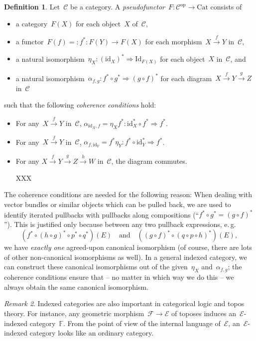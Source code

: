 \documentclass[a4paper,english,12pt]{scrartcl}
\theoremstyle{definition}
\newtheorem{defn}{Definition}[section]
\theoremstyle{plain}
\theoremstyle{remark}
\newtheorem{rem}[defn]{Remark}
\newcommand{\FF}{\mathbb{F}}
\newcommand{\C}{\mathcal{C}}
\newcommand{\E}{\mathcal{E}}
\newcommand{\F}{\mathcal{F}}
\newcommand{\id}{\mathrm{id}}
\newcommand{\op}{\mathrm{op}}
\newcommand{\xra}[1]{\xrightarrow{#1}}
\newcommand{\Cat}{\mathrm{Cat}}
\newcommand{\Id}{\mathrm{Id}}
\begin{document}
\begin{defn}Let~$\C$ be a category. A \emph{pseudofunctor}~$F : \C^\op \to
\Cat$ consists of
\begin{itemize}
\item a category~$F(X)$ for each object~$X$ of~$\C$,
\item a functor~$F(f) =: f^* : F(Y) \to F(X)$ for each morphism~$X \xra{f} Y$ in~$\C$,
\item a natural isomorphism~$\eta_X : (\id_X)^* \Rightarrow \Id_{F(X)}$ for each
object~$X$ in~$\C$, and
\item a natural isomorphism~$\alpha_{f,g} : f^* \circ g^* \Rightarrow (g \circ
f)^*$ for each diagram~$X \xra{f} Y \xra{g} Z$ in~$\C$
\end{itemize}
such that the following \emph{coherence conditions} hold:
\begin{itemize}
\item For any~$X \xra{f} Y$ in~$\C$, $\alpha_{\id_X,f} = \eta_X f^* : \id_X^* \circ f^*
\Rightarrow f^*$.
\item For any~$X \xra{f} Y$ in~$\C$, $\alpha_{f,\id_Y} = f^* \eta_Y : f^* \circ
\id_Y^* \Rightarrow f^*$.
\item For any $X \xra{f} Y \xra{g} Z \xra{h} W$ in~$\C$, the diagram commutes.

XXX
\end{itemize}
\end{defn}

The coherence conditions are needed for the following reason:
When dealing with vector bundles or similar objects which can be pulled back,
we are used to identify iterated pullbacks with pullbacks along compositions
(``$f^* \circ g^* = (g \circ f)^*$'').
This is justified only because between any
two pullback expressions, e.\,g.\@
\[ (f^* \circ (h \circ g)^* \circ p^* \circ q^*)(E) \quad\text{and}\quad
  ((g \circ f)^* \circ (q \circ p \circ h)^*)(E), \]
we have \emph{exactly one} agreed-upon canonical isomorphism (of course, there
are lots of other non-canonical isomorphisms as well). In a general indexed
category, we can construct these canonical isomorphisms out of the
given~$\eta_X$ and~$\alpha_{f,g}$; the coherence conditions ensure that -- no
matter in which way we do this -- we always obtain the same canonical
isomorphism.

\begin{rem}Indexed categories are also important in categorical logic and topos
theory. For instance, any geometric morphism~$\F \to \E$ of toposes induces
an~$\E$-indexed category~$\FF$. From the point of view of the internal language
of~$\E$, an~$\E$-indexed category looks like an ordinary category.
\end{rem}
\end{document}
